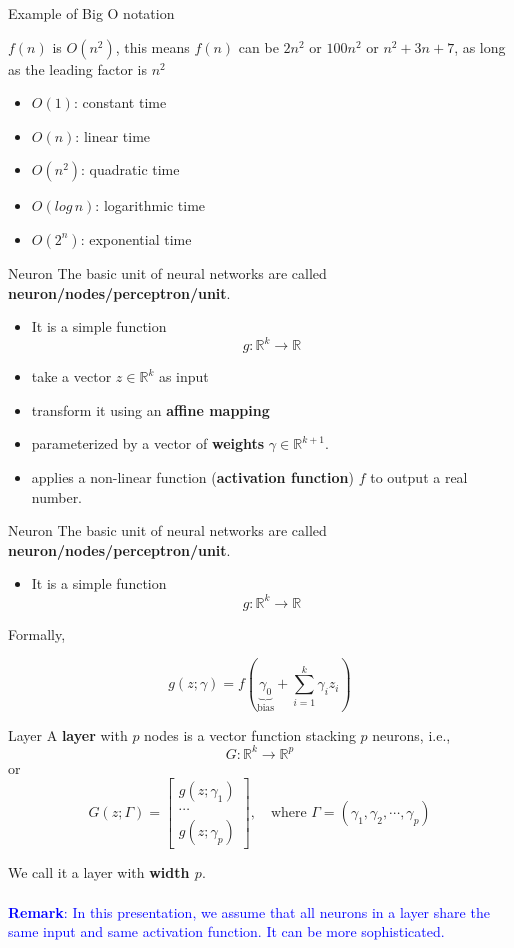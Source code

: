 \documentclass[aspectratio=169]{beamer} %
\begin{document}
\begin{frame}{Example of Big O notation}

$f(n)$ is $O(n^2)$, this means $f(n)$ can be $2n^2$ or $100 n^2$ or $n^2+3n+7$, as long as the leading factor is $n^2$
\begin{itemize}
    \item $O(1)$: constant time
    \item $O(n)$: linear time
    \item $O(n^2)$: quadratic time
    \item $O(log\,n )$:  logarithmic time
    \item $O(2^n)$: exponential time
\end{itemize}
\end{frame}
\begin{frame}{Neuron}
The basic unit of neural networks are called \textbf{neuron/nodes/perceptron/unit}. 
\begin{itemize}
    \item It is a simple function
    $$
    g: \mathbb{R}^k \to \mathbb{R}
    $$
    \item take a vector $z\in\mathbb{R}^k$ as input
    \item transform it using an \textbf{affine mapping}
    \item parameterized by a vector of \textbf{weights} $\gamma\in\mathbb{R}^{k+1}$.
    \item applies a non-linear function (\textbf{activation function}) $f$ to output a real number.
\end{itemize}
    
\end{frame}


\begin{frame}{Neuron}
    The basic unit of neural networks are called \textbf{neuron/nodes/perceptron/unit}. 
\begin{itemize}
    \item It is a simple function
    $$
    g: \mathbb{R}^k \to \mathbb{R}
    $$
\end{itemize}
Formally,

$$
g(z;\gamma) = f\left(\underbrace{\gamma_0}_{\text{bias}} + \sum_{i=1}^k \gamma_i z_i\right)
$$
\end{frame}

\begin{frame}{Layer}
A \textbf{layer} with $p$ nodes is a vector function stacking $p$ neurons, i.e.,
$$
G:\mathbb{R}^k \to \mathbb{R}^p
$$
or
$$
G(z;\Gamma)  = \begin{bmatrix}
    g(z;\gamma_1)\\
    \cdots\\
    g(z;\gamma_p)
\end{bmatrix},\quad \text{where $\Gamma = (\gamma_1, \gamma_2,\cdots, \gamma_p)$}
$$

We call it a layer with \textbf{width $p$}.\\
\\
\textcolor{blue}{\textbf{Remark}: In this presentation, we assume that all neurons in a layer share the same input and same activation function. It can be more sophisticated.}
\end{frame}
\end{document}
